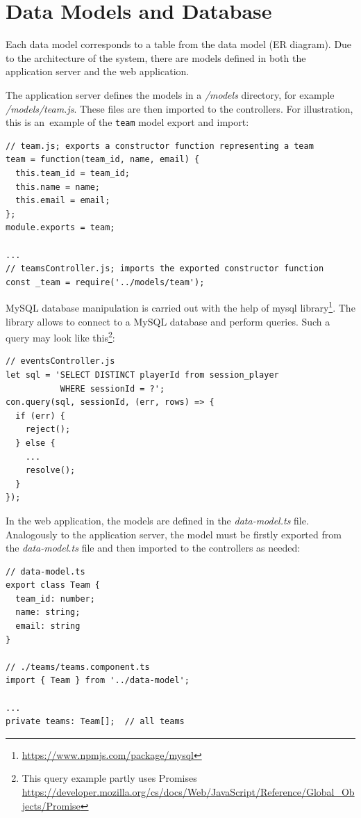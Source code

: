 \section{Data Models and Database}
Each data model corresponds to a table from the data model (ER diagram). Due to the architecture of the system, there are models defined in both the application server and the web application.

The application server defines the models in a \textit{/models} directory, for example \textit{/models/\-team.js}. These files are then imported to the controllers. For illustration, this is an~example of the \texttt{team} model export and import:

\begin{verbatim}
// team.js; exports a constructor function representing a team
team = function(team_id, name, email) {
  this.team_id = team_id;
  this.name = name;
  this.email = email;
};
module.exports = team;

...
// teamsController.js; imports the exported constructor function
const _team = require('../models/team');
\end{verbatim}

MySQL database manipulation is carried out with the help of mysql library\footnote{\url{https://www.npmjs.com/package/mysql}}. The library allows to connect to a MySQL database and perform queries. Such a query may look like this\footnote{This query example partly uses Promises \url{https://developer.mozilla.org/cs/docs/Web/JavaScript/Reference/Global_Objects/Promise}}:

\begin{verbatim}
// eventsController.js
let sql = 'SELECT DISTINCT playerId from session_player 
           WHERE sessionId = ?';
con.query(sql, sessionId, (err, rows) => {
  if (err) {
    reject();
  } else {
    ...
    resolve();
  }
});
\end{verbatim}

In the web application, the models are defined in the \textit{data-model.ts} file. Analogously to the application server, the model must be firstly exported from the \textit{data-model.ts} file and then imported to the controllers as needed:

\newpage
\begin{verbatim}
// data-model.ts
export class Team {
  team_id: number;
  name: string;
  email: string
}

// ./teams/teams.component.ts
import { Team } from '../data-model';

...
private teams: Team[];	// all teams
\end{verbatim}

